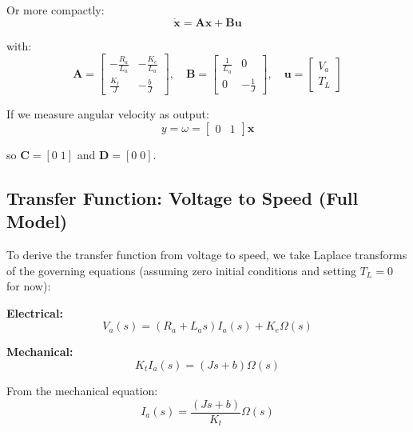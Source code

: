 Or more compactly:
\begin{equation}
    \dot{\mathbf{x}} = \mathbf{A} \mathbf{x} + \mathbf{B} \mathbf{u}
\end{equation}

with:
\begin{equation}
    \mathbf{A} = \begin{bmatrix} -\frac{R_a}{L_a} & -\frac{K_e}{L_a} \\[6pt] \frac{K_t}{J} & -\frac{b}{J} \end{bmatrix}, \quad
    \mathbf{B} = \begin{bmatrix} \frac{1}{L_a} & 0 \\[6pt] 0 & -\frac{1}{J} \end{bmatrix}, \quad
    \mathbf{u} = \begin{bmatrix} V_a \\ T_L \end{bmatrix}
\end{equation}

If we measure angular velocity as output:
\begin{equation}
    y = \omega = \begin{bmatrix} 0 & 1 \end{bmatrix} \mathbf{x}
\end{equation}

so $\mathbf{C} = [0 \; 1]$ and $\mathbf{D} = [0 \; 0]$.

\subsection{Transfer Function: Voltage to Speed (Full Model)}

To derive the transfer function from voltage to speed, we take Laplace transforms of the governing equations (assuming zero initial conditions and setting $T_L = 0$ for now):

\textbf{Electrical:}
\begin{equation}
    V_a(s) = (R_a + L_a s) I_a(s) + K_e \Omega(s)
    \label{eq:laplace_electrical}
\end{equation}

\textbf{Mechanical:}
\begin{equation}
    K_t I_a(s) = (Js + b) \Omega(s)
    \label{eq:laplace_mechanical}
\end{equation}

From the mechanical equation:
\begin{equation}
    I_a(s) = \frac{(Js + b)}{K_t} \Omega(s)
\end{equation}

